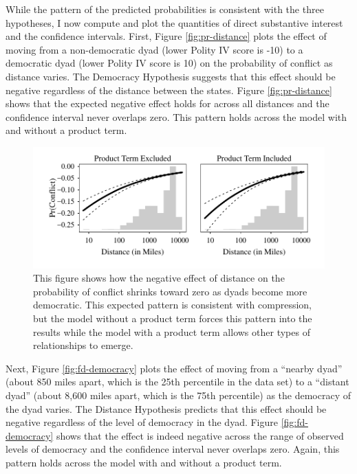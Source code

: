 \documentclass[12pt]{article}
\begin{document}
While the pattern of the predicted probabilities is consistent with the three hypotheses, I now compute and plot the quantities of direct substantive interest and the confidence intervals. First, Figure \ref{fig:pr-distance} plots the effect of moving from a non-democratic dyad (lower Polity IV score is -10) to a democratic dyad (lower Polity IV score is 10) on the probability of conflict as distance varies. The Democracy Hypothesis suggests that this effect should be negative regardless of the distance between the states. Figure \ref{fig:pr-distance} shows that the expected negative effect holds for across all distances and the confidence interval never overlaps zero. This pattern holds across the model with and without a product term.

        \begin{figure}[H]
        \begin{center}
        \includegraphics[scale = .8]{fig/fig-fd-distance.pdf}
        \end{center}\caption{This figure shows how the negative effect of distance on the probability of conflict shrinks toward zero as dyads become more democratic. This expected pattern is consistent with compression, but the model without a product term forces this pattern into the results while the model with a product term allows other types of relationships to emerge.}\label{fig:fd-distance}
        \end{figure}

Next, Figure \ref{fig:fd-democracy} plots the effect of moving from a ``nearby dyad'' (about 850 miles apart, which is the 25th percentile in the data set) to a ``distant dyad'' (about 8,600 miles apart, which is the 75th percentile) as the democracy of the dyad varies. The Distance Hypothesis predicts that this effect should be negative regardless of the level of democracy in the dyad. Figure \ref{fig:fd-democracy} shows that the effect is indeed negative across the range of observed levels of democracy and the confidence interval never overlaps zero. Again, this pattern holds across the model with and without a product term.
        
\end{document}
